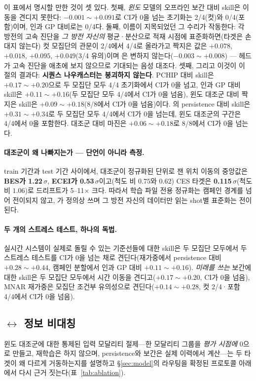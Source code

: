 \documentclass[10pt,a4paper]{article}
\begin{document}
이 표에서 명시할 만한 것이 셋 있다. 첫째, \emph{윈도} 모델의 오프라인 보간 대비
skill은 이동을 견디지 못한다: $-0.001\sim+0.091$로 CI가 0을 넘는 초기화는 2/4(컷)와
0/4(포함)이며, 인과 GP 대비로는 0/4다. 둘째, 이름이 지목되었던 그 수리가 작동한다: 각 방전의 고속 진단을
\emph{그 방전 자신의} 평균·분산으로 적재 시점에 표준화하면(타겟은 손대지 않는다)
컷 모집단의 관문이 2/4에서 4/4로 올라가고 짝지은 값은 $+0.078$, $+0.018$,
$+0.095$, $+0.049$(3/4 유의)이며 \Vrot{}은 변하지 않는다($-0.003\sim+0.008$)
---\Vrot{} 헤드가 고속 진단을 애초에 보지 않으므로 기대되는 음성 대조다. 셋째,
그리고 이것이 이 절의 결과다: \textbf{시퀀스 나우캐스터는 붕괴하지 않는다}.
PCHIP 대비 skill은 $+0.17\sim+0.20$으로 두 모집단 모두 4/4 초기화에서 CI가 0을
넘고, 인과 GP 대비 skill은 $+0.11\sim+0.16$(두 모집단 모두 4/4에서 CI가 0을 넘음),
윈도 대조군 대비 짝지은 skill은 $+0.09\sim+0.18$(8/8에서 CI가 0을 넘음)이다.
\Vrot{}의 persistence 대비 skill은 $+0.31\sim+0.34$로 두 모집단 모두 4/4에서 CI가
0을 넘는데, 윈도 대조군의 구간은 4/4에서 0을 포함한다. 대조군 대비 \Vrot{} 마진은
$+0.06\sim+0.18$로 8/8에서 CI가 0을 넘는다.

\paragraph{대조군이 왜 나빠지는가 --- 단언이 아니라 측정.}
train 기간과 test 기간 사이에서, 대조군이 정규화된 단위로 잰 위치 이동의 중앙값은
\textbf{BES가 1.22\,$\sigma$}, \textbf{ECEI가 0.53\,$\sigma$}이고(척도 비 $0.75$와
$0.62$) CES 타겟은 \textbf{0.115\,$\sigma$}(척도 비 $1.06$)로 드리프트가
5--11$\times$ 크다. 따라서 학습 파일 전용 정규화는 캠페인 경계를 넘어 전이되지 않고,
\seqv{}가 정의상 쓰며 그 방전 자신의 데이터만 읽는 shot별 표준화는 전이된다.

\paragraph{두 개의 스트레스 테스트, 하나의 독법.}
실시간 시스템이
실제로 돌릴 수 있는 기준선들에 대한 skill은 두 모집단 모두에서 두 스트레스
테스트를 CI가 0을 넘는 채로 견딘다(재가중에서 persistence 대비 $+0.28\sim+0.44$,
캠페인 분할에서 인과 GP 대비 $+0.11\sim+0.16$). \emph{미래를 쓰는} 보간에 대한
skill은 두 모집단 모두에서 시간 이동을 견디고($+0.17\sim+0.20$, CI가 0을 넘음),
MNAR 재가중은 모집단 조건부 유의성으로 견딘다($+0.14\sim+0.28$, 컷 2/4·포함
4/4에서 CI가 0을 넘음).

\subsection{\Ti$\leftrightarrow$\Vrot{} 정보 비대칭}
\label{sec:asym}
윈도 대조군에 대한 통제된 입력 모달리티 절제---한 모달리티 그룹을 \emph{평가
시점에} 0으로 만들고, 재학습은 하지 않으며, persistence와 보간은 실제 이력에서
계산---는 두 타겟이 왜 다르게 거동하는지를 설명하고 \S\ref{sec:model}의 라우팅을
확정된 프로토콜 아래에서 다시 근거 짓는다(표~\ref{tab:ablation}).
\end{document}
